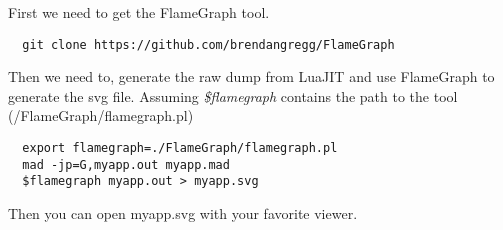First we need to get the FlameGraph \cite{flamegraph} tool.
\begin{center}
\begin{lstlisting}
  git clone https://github.com/brendangregg/FlameGraph
\end{lstlisting}
\end{center}
Then we need to, generate the raw dump from LuaJIT and use FlameGraph to generate
the svg file. Assuming \emph{\$flamegraph} contains the path to the tool (/FlameGraph/flamegraph.pl)

\begin{center}
\begin{lstlisting}
  export flamegraph=./FlameGraph/flamegraph.pl
  mad -jp=G,myapp.out myapp.mad
  $flamegraph myapp.out > myapp.svg
\end{lstlisting}
\end{center}
Then you can open myapp.svg with your favorite viewer.
